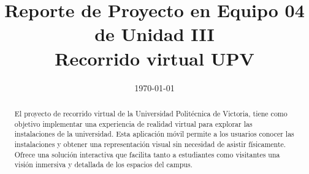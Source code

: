 \documentclass[conference]{IEEEtran}
\date{\specialdate\today}
\begin{document}
%
%
%

\newcommand{\breite}{0.9} %
\newcommand{\RelacionFiguradoscolumnas}{0.9}
\newcommand{\RelacionFiguradoscolumnasPuntoCinco}{0.45}




\title{Reporte de Proyecto en Equipo 04 de Unidad III \\ Recorrido virtual UPV}

\author{
}



\maketitle

\begin{abstract} 
El proyecto de recorrido virtual de la Universidad Politécnica de Victoria, tiene como objetivo implementar una experiencia de realidad virtual para explorar las instalaciones de la universidad. Esta aplicación móvil permite a los usuarios conocer las instalaciones y obtener una representación visual sin necesidad de asistir físicamente. Ofrece una solución interactiva que facilita tanto a estudiantes como visitantes una visión inmersiva y detallada de los espacios del campus.
\end{abstract}


\end{document}
